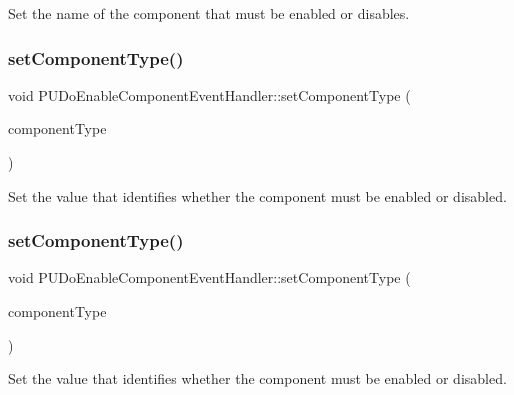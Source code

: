 Set the name of the component that must be enabled or disables. \mbox{\label{classPUDoEnableComponentEventHandler_a1d7742b4e01e3de32d6fb93952028353}} 
\subsubsection{\texorpdfstring{set\+Component\+Type()}{setComponentType()}\hspace{0.1cm}{\footnotesize\ttfamily [1/2]}}
{\footnotesize\ttfamily void P\+U\+Do\+Enable\+Component\+Event\+Handler\+::set\+Component\+Type (\begin{DoxyParamCaption}\item[{P\+U\+Component\+Type}]{component\+Type }\end{DoxyParamCaption})\hspace{0.3cm}{\ttfamily [inline]}}

Set the value that identifies whether the component must be enabled or disabled. \mbox{\label{classPUDoEnableComponentEventHandler_a1d7742b4e01e3de32d6fb93952028353}} 
\subsubsection{\texorpdfstring{set\+Component\+Type()}{setComponentType()}\hspace{0.1cm}{\footnotesize\ttfamily [2/2]}}
{\footnotesize\ttfamily void P\+U\+Do\+Enable\+Component\+Event\+Handler\+::set\+Component\+Type (\begin{DoxyParamCaption}\item[{P\+U\+Component\+Type}]{component\+Type }\end{DoxyParamCaption})\hspace{0.3cm}{\ttfamily [inline]}}

Set the value that identifies whether the component must be enabled or disabled. 

